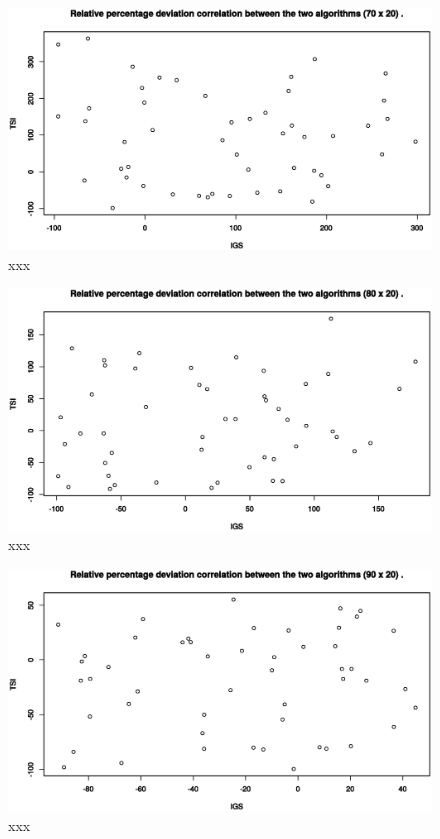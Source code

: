 \begin{figure}[H]
	\centering
	\includegraphics[width=\textwidth]{fig/corr/70x20}
	\caption{xxx}
\end{figure}

\begin{figure}[H]
	\centering
	\includegraphics[width=\textwidth]{fig/corr/80x20}
	\caption{xxx}
\end{figure}

\begin{figure}[H]
	\centering
	\includegraphics[width=\textwidth]{fig/corr/90x20}
	\caption{xxx}
\end{figure}